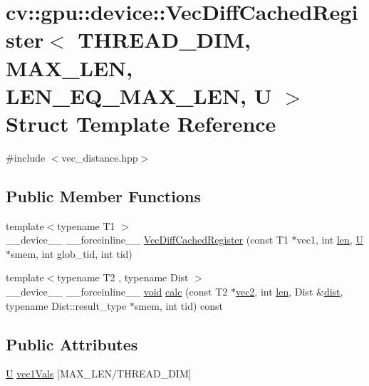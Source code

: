 \hypertarget{structcv_1_1gpu_1_1device_1_1VecDiffCachedRegister}{\section{cv\-:\-:gpu\-:\-:device\-:\-:Vec\-Diff\-Cached\-Register$<$ T\-H\-R\-E\-A\-D\-\_\-\-D\-I\-M, M\-A\-X\-\_\-\-L\-E\-N, L\-E\-N\-\_\-\-E\-Q\-\_\-\-M\-A\-X\-\_\-\-L\-E\-N, U $>$ Struct Template Reference}
\label{structcv_1_1gpu_1_1device_1_1VecDiffCachedRegister}
}


{\ttfamily \#include $<$vec\-\_\-distance.\-hpp$>$}

\subsection*{Public Member Functions}
\begin{DoxyCompactItemize}
\item 
{\footnotesize template$<$typename T1 $>$ }\\\-\_\-\-\_\-device\-\_\-\-\_\- \-\_\-\-\_\-forceinline\-\_\-\-\_\- \hyperlink{structcv_1_1gpu_1_1device_1_1VecDiffCachedRegister_a22320e5f7c15b951bc65521fa230cd89}{Vec\-Diff\-Cached\-Register} (const T1 $\ast$vec1, int \hyperlink{core__c_8h_accb79be93f4fbcaa15b5a7670569c9f8}{len}, \hyperlink{core__c_8h_aa9c521f41af9a5191e5e4b6ffbae211a}{U} $\ast$smem, int glob\-\_\-tid, int tid)
\item 
{\footnotesize template$<$typename T2 , typename Dist $>$ }\\\-\_\-\-\_\-device\-\_\-\-\_\- \-\_\-\-\_\-forceinline\-\_\-\-\_\- \hyperlink{legacy_8hpp_a8bb47f092d473522721002c86c13b94e}{void} \hyperlink{structcv_1_1gpu_1_1device_1_1VecDiffCachedRegister_a3b373ae301a083770fba9d42111dbd12}{calc} (const T2 $\ast$\hyperlink{core__c_8h_aa709adb546262d915d3c98aacf3bb71a}{vec2}, int \hyperlink{core__c_8h_accb79be93f4fbcaa15b5a7670569c9f8}{len}, Dist \&\hyperlink{legacy_8hpp_ae895c2003a87eda49126845b7ac3688e}{dist}, typename Dist\-::result\-\_\-type $\ast$smem, int tid) const 
\end{DoxyCompactItemize}
\subsection*{Public Attributes}
\begin{DoxyCompactItemize}
\item 
\hyperlink{core__c_8h_aa9c521f41af9a5191e5e4b6ffbae211a}{U} \hyperlink{structcv_1_1gpu_1_1device_1_1VecDiffCachedRegister_aa98de18f95416e41be4fc95ba49502bc}{vec1\-Vals} \mbox{[}M\-A\-X\-\_\-\-L\-E\-N/T\-H\-R\-E\-A\-D\-\_\-\-D\-I\-M\mbox{]}
\end{DoxyCompactItemize}


